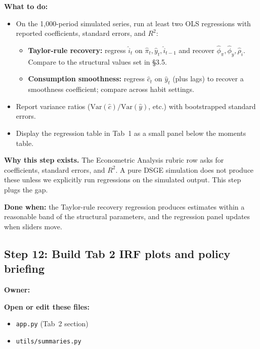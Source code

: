 \documentclass[11pt]{article}
\newcommand{\nameblank}{\underline{\hspace{4.5cm}}}
\begin{document}
\textbf{What to do:}
\begin{itemize}
    \item On the 1{,}000-period simulated series, run at least two OLS regressions with reported coefficients, standard errors, and $R^2$:
    \begin{itemize}
        \item \textbf{Taylor-rule recovery:} regress $\hat{i}_t$ on $\hat{\pi}_t, \hat{y}_t, \hat{i}_{t-1}$ and recover $\hat{\phi}_\pi, \hat{\phi}_y, \hat{\rho}_i$. Compare to the structural values set in \S3.5.
        \item \textbf{Consumption smoothness:} regress $\hat{c}_t$ on $\hat{y}_t$ (plus lags) to recover a smoothness coefficient; compare across habit settings.
    \end{itemize}
    \item Report variance ratios ($\mathrm{Var}(\hat{c})/\mathrm{Var}(\hat{y})$, etc.) with bootstrapped standard errors.
    \item Display the regression table in Tab~1 as a small panel below the moments table.
\end{itemize}

\begin{notebox}
\textbf{Why this step exists.} The Econometric Analysis rubric row asks for coefficients, standard errors, and $R^2$. A pure DSGE simulation does not produce these unless we explicitly run regressions on the simulated output. This step plugs the gap.
\end{notebox}

\textbf{Done when:} the Taylor-rule recovery regression produces estimates within a reasonable band of the structural parameters, and the regression panel updates when sliders move.

\subsection{Step 12: Build Tab 2 IRF plots and policy briefing}
\textbf{Owner:} \nameblank

\textbf{Open or edit these files:}
\begin{itemize}
    \item \texttt{app.py} (Tab~2 section)
    \item \texttt{utils/summaries.py}
\end{itemize}
\end{document}
